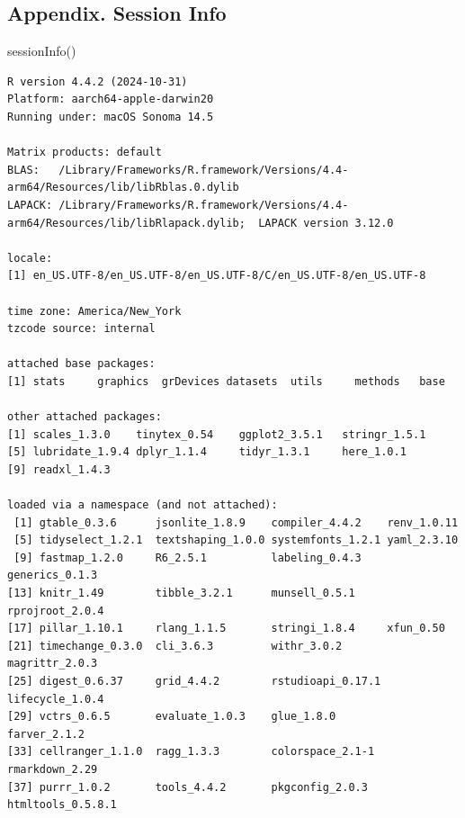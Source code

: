 \documentclass[
  letterpaper,
  DIV=11,
  numbers=noendperiod]{scrartcl}
\newenvironment{Shaded}{\begin{snugshade}}{\end{snugshade}}
\newcommand{\FunctionTok}[1]{\textcolor[rgb]{0.28,0.35,0.67}{#1}}
\newcommand{\NormalTok}[1]{\textcolor[rgb]{0.00,0.23,0.31}{#1}}
\begin{document}
\subsection{Appendix. Session Info}\label{appendix.-session-info}

\begin{Shaded}
\begin{Highlighting}[]
\FunctionTok{sessionInfo}\NormalTok{()}
\end{Highlighting}
\end{Shaded}

\begin{verbatim}
R version 4.4.2 (2024-10-31)
Platform: aarch64-apple-darwin20
Running under: macOS Sonoma 14.5

Matrix products: default
BLAS:   /Library/Frameworks/R.framework/Versions/4.4-arm64/Resources/lib/libRblas.0.dylib 
LAPACK: /Library/Frameworks/R.framework/Versions/4.4-arm64/Resources/lib/libRlapack.dylib;  LAPACK version 3.12.0

locale:
[1] en_US.UTF-8/en_US.UTF-8/en_US.UTF-8/C/en_US.UTF-8/en_US.UTF-8

time zone: America/New_York
tzcode source: internal

attached base packages:
[1] stats     graphics  grDevices datasets  utils     methods   base     

other attached packages:
[1] scales_1.3.0    tinytex_0.54    ggplot2_3.5.1   stringr_1.5.1  
[5] lubridate_1.9.4 dplyr_1.1.4     tidyr_1.3.1     here_1.0.1     
[9] readxl_1.4.3   

loaded via a namespace (and not attached):
 [1] gtable_0.3.6      jsonlite_1.8.9    compiler_4.4.2    renv_1.0.11      
 [5] tidyselect_1.2.1  textshaping_1.0.0 systemfonts_1.2.1 yaml_2.3.10      
 [9] fastmap_1.2.0     R6_2.5.1          labeling_0.4.3    generics_0.1.3   
[13] knitr_1.49        tibble_3.2.1      munsell_0.5.1     rprojroot_2.0.4  
[17] pillar_1.10.1     rlang_1.1.5       stringi_1.8.4     xfun_0.50        
[21] timechange_0.3.0  cli_3.6.3         withr_3.0.2       magrittr_2.0.3   
[25] digest_0.6.37     grid_4.4.2        rstudioapi_0.17.1 lifecycle_1.0.4  
[29] vctrs_0.6.5       evaluate_1.0.3    glue_1.8.0        farver_2.1.2     
[33] cellranger_1.1.0  ragg_1.3.3        colorspace_2.1-1  rmarkdown_2.29   
[37] purrr_1.0.2       tools_4.4.2       pkgconfig_2.0.3   htmltools_0.5.8.1
\end{verbatim}
\end{document}
